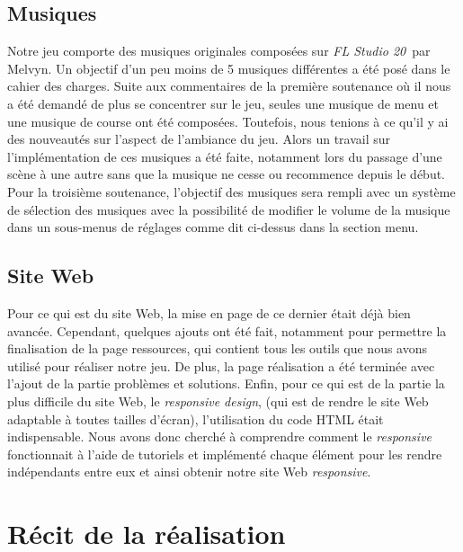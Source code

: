\documentclass[12pt,a4paper]{article}
\newcommand{\FL}{\textsl{FL Studio 20}}
\begin{document}
        \subsection{Musiques}
            Notre jeu comporte des musiques originales composées sur \FL\, par Melvyn. Un objectif d'un 
            peu moins de 5 musiques différentes a été posé dans le cahier des charges. Suite aux 
            commentaires de la première soutenance où il nous a été demandé de plus se concentrer sur le
            jeu, seules une musique de menu et une musique de course ont été composées. Toutefois, nous 
            tenions à ce qu'il y ai des nouveautés sur l'aspect de l'ambiance du jeu. Alors un travail 
            sur l'implémentation de ces musiques a été faite, notamment lors du passage d'une scène à
            une autre sans que la musique ne cesse ou recommence depuis le début. Pour la troisième 
            soutenance, l'objectif des musiques sera rempli avec un système de sélection des musiques 
            avec la possibilité de modifier le volume de la musique dans un sous-menus de réglages comme
            dit ci-dessus dans la section menu.

        \clearpage
        
        \subsection{Site Web}
            Pour ce qui est du site Web, la mise en page de ce dernier était déjà bien avancée. 
            Cependant, quelques ajouts ont été fait, notamment pour permettre la finalisation de la 
            page ressources, qui contient tous les outils que nous avons utilisé pour réaliser notre 
            jeu. De plus, la page réalisation a été terminée avec l'ajout de la partie 
            problèmes et solutions.
            Enfin, pour ce qui est de la partie la plus difficile du site Web, le \textit{responsive 
            design}, (qui est de rendre le site Web adaptable à toutes tailles d'écran), l'utilisation 
            du code HTML était indispensable. Nous avons donc cherché à comprendre comment le 
            \textit{responsive} fonctionnait à l'aide de tutoriels et implémenté chaque élément 
            pour les rendre indépendants entre eux et ainsi obtenir notre site Web \textit{responsive}.


    \clearpage
    \section{Récit de la réalisation}
\end{document}
